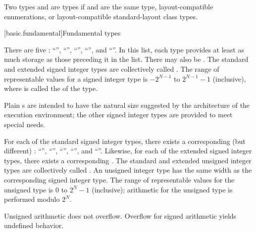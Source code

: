 \pnum
{}%
Two types   and   are
 types
if  and  are the same type,
layout-compatible enumerations, or
layout-compatible standard-layout class types.

[basic.fundamental]{Fundamental types}

\pnum
{}%
%
There are five  :
%
%
%
%
%
``'', ``'', ``'',
``'', and ``''. In
this list, each type provides at least as much storage as those
preceding it in the list.
%
%
There may also be 
.
The standard and extended signed integer types are collectively called
.
The range of representable values for a signed integer type is
$-2^{N-1}$ to $2^{N-1}-1$ (inclusive),
where  is called the  of the type.
%
\begin{note}
Plain s are intended to have
the natural size suggested by the architecture of the execution environment;
the other signed integer types are provided to meet special needs.
\end{note}

\pnum
{}%
%
For each of the standard signed integer types,
there exists a corresponding (but different)
%
:
%
%
%
%
%
``'', ``'',
``'', ``'', and
``''.
%
Likewise, for each of the extended signed integer types,
there exists a corresponding .
The standard and extended unsigned integer types
are collectively called .
An unsigned integer type has the same width 
as the corresponding signed integer type.
%
The range of representable values for the unsigned type is
$0$ to $2^N-1$ (inclusive);
arithmetic for the unsigned type is performed modulo $2^N$.
\begin{note}
Unsigned arithmetic does not overflow.
Overflow for signed arithmetic yields undefined behavior.
\end{note}

